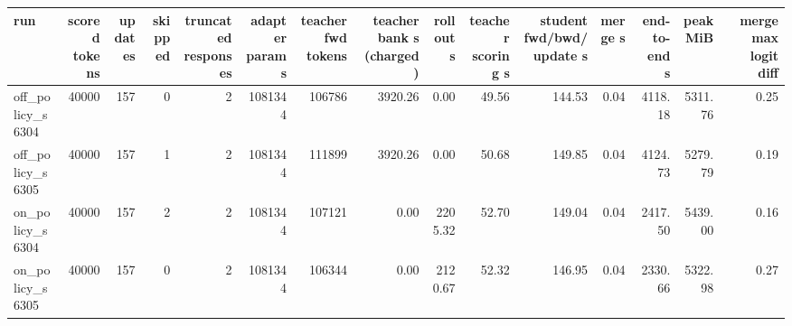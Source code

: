 \begin{tabular}{lrrrrrrrrrrrrrr}
\toprule
run & scored tokens & updates & skipped & truncated responses & adapter params & teacher fwd tokens & teacher bank s (charged) & rollout s & teacher scoring s & student fwd/bwd/update s & merge s & end-to-end s & peak MiB & merge max logit diff \\
\midrule
off\_policy\_s6304 & 40000 & 157 & 0 & 2 & 1081344 & 106786 & 3920.26 & 0.00 & 49.56 & 144.53 & 0.04 & 4118.18 & 5311.76 & 0.25 \\
off\_policy\_s6305 & 40000 & 157 & 1 & 2 & 1081344 & 111899 & 3920.26 & 0.00 & 50.68 & 149.85 & 0.04 & 4124.73 & 5279.79 & 0.19 \\
on\_policy\_s6304 & 40000 & 157 & 2 & 2 & 1081344 & 107121 & 0.00 & 2205.32 & 52.70 & 149.04 & 0.04 & 2417.50 & 5439.00 & 0.16 \\
on\_policy\_s6305 & 40000 & 157 & 0 & 2 & 1081344 & 106344 & 0.00 & 2120.67 & 52.32 & 146.95 & 0.04 & 2330.66 & 5322.98 & 0.27 \\
\bottomrule
\end{tabular}
